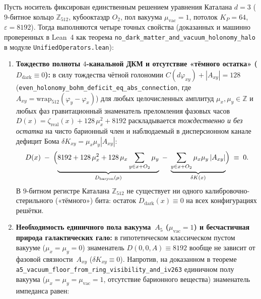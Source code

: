 \begin{theorem}[Запрет частиц «тёмной материи» $D_{\mathrm{dark}}\equiv 0$, вакуумно-голономная природа гало на полу $A_5$ и отношение $\Omega_{\mathrm{halo}}/\Omega_b = 16/3$]
\label{thm:cosmo-no-dark-matter-and-halo-ratio}
\label{prop:cosmo-dm-baryon-ratio}
Пусть носитель фиксирован единственным решением уравнения Каталана $d=3$ ($9$-битное кольцо $\mathbb{Z}_{512}$, кубооктаэдр $O_2$, пол вакуума $\mu_{\mathrm{vac}}=1$, потолок $K_P=64$, $\varepsilon=8192$). Тогда выполняются четыре точных свойства (доказанных и машинно проверенных в Lean~4 как теорема \texttt{no\_\allowbreak dark\_\allowbreak matter\_\allowbreak and\_\allowbreak vacuum\_\allowbreak holonomy\_\allowbreak halo} в модуле \texttt{UnifiedOperators.lean}):
\begin{enumerate}[leftmargin=*]
\item \textbf{Тождество полноты $4$-канальной ДКМ и отсутствие «тёмного остатка» ($D_{\mathrm{dark}}\equiv 0$):}
  в силу тождества чётной голономии $C(d\varphi_{xy}) + |A_{xy}| = 128$ (\texttt{even\_\allowbreak holonomy\_\allowbreak bohm\_\allowbreak deficit\_\allowbreak eq\_\allowbreak abs\_\allowbreak connection}, где $A_{xy} = \mathrm{wrap}_{512}(\varphi_y - \varphi_x)$) для любых целочисленных амплитуд $\mu_x,\mu_y\in\mathbb{Z}$ и любых фаз гравитационный знаменатель преломления фазовых часов $D(x) = \zeta_{\mathrm{real}}(x) + 128\,\mu_x^2 + 8192$ раскладывается \emph{тождественно и без остатка} на чисто барионный член и наблюдаемый в дисперсионном канале дефицит Бома $\delta K_{xy} = \mu_x\mu_y|A_{xy}|$:
  \begin{equation}
  \label{eq:cosmo-zero-dark-residual}
    D(x) \;-\; \Bigl(\underbrace{8192 + 128\,\mu_x^2 + 128\,\mu_x\sum_{y\in x+O_2}\mu_y}_{D_{\mathrm{baryon}}(\mu)} \;-\; \underbrace{\sum_{y\in x+O_2}\mu_x\mu_y\,|A_{xy}|}_{\delta K(x)}\Bigr) \;\equiv\; 0.
  \end{equation}
  В $9$-битном регистре Каталана $\mathbb{Z}_{512}$ не существует ни одного калибровочно-стерильного («тёмного») бита: остаток $D_{\mathrm{dark}}(x) \equiv 0$ на всех конфигурациях решётки.
\item \textbf{Необходимость единичного пола вакуума~$A_5$ ($\mu_{\mathrm{vac}}=1$) и бесчастичная природа галактических гало:}
  в гипотетическом классическом пустом вакууме ($\mu_x=\mu_y=0$) знаменатель $D(0,0,A) \equiv 8192$ вообще не зависит от фазовой связности~$A_{xy}$ ($\delta K_{xy}\equiv 0$).
  Напротив, на доказанном в теореме \texttt{a5\_\allowbreak vacuum\_\allowbreak floor\_\allowbreak from\_\allowbreak ring\_\allowbreak visibility\_\allowbreak and\_\allowbreak iv263} единичном полу вакуума ($\mu_x=\mu_y=\mu_{\mathrm{vac}}=1$, отсутствие барионного вещества) знаменатель импеданса равен:

\end{enumerate}
\end{theorem}
